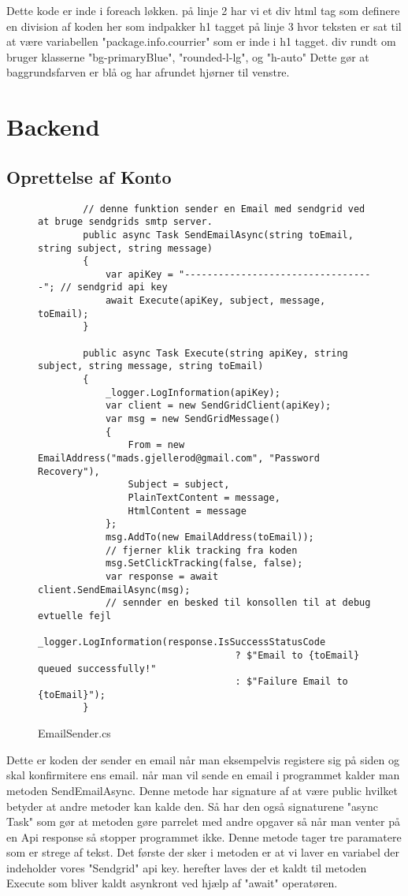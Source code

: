 Dette kode er inde i foreach løkken. på linje 2 har vi et div html tag som definere en division af koden
her  som indpakker h1 tagget på linje 3 hvor teksten er sat til at være variabellen "package.info.courrier" som er 
inde i h1 tagget. div rundt om bruger klasserne "bg-primaryBlue", "rounded-l-lg", og "h-auto" Dette gør at baggrundsfarven er blå
og har afrundet hjørner til venstre.


\section{Backend}
\subsection{Oprettelse af Konto}
\newpage
\begin{figure}[!ht]
    \begin{verbatim}
        // denne funktion sender en Email med sendgrid ved at bruge sendgrids smtp server.
        public async Task SendEmailAsync(string toEmail, string subject, string message)
        {
            var apiKey = "----------------------------------"; // sendgrid api key
            await Execute(apiKey, subject, message, toEmail);
        }
    
        public async Task Execute(string apiKey, string subject, string message, string toEmail)
        {
            _logger.LogInformation(apiKey);
            var client = new SendGridClient(apiKey);
            var msg = new SendGridMessage()
            {
                From = new EmailAddress("mads.gjellerod@gmail.com", "Password Recovery"),
                Subject = subject,
                PlainTextContent = message,
                HtmlContent = message
            };
            msg.AddTo(new EmailAddress(toEmail));
            // fjerner klik tracking fra koden 
            msg.SetClickTracking(false, false);
            var response = await client.SendEmailAsync(msg);
            // sennder en besked til konsollen til at debug evtuelle fejl
            _logger.LogInformation(response.IsSuccessStatusCode
                                   ? $"Email to {toEmail} queued successfully!"
                                   : $"Failure Email to {toEmail}");
        }
    \end{verbatim}
\caption{EmailSender.cs}\label{code:EmailSender.cs}
\end{figure}

Dette er koden der sender en email når man eksempelvis registere sig på siden og skal 
konfirmitere ens email. når man vil sende en email i programmet kalder man metoden SendEmailAsync.
Denne metode har signature af at være public hvilket betyder at andre metoder kan kalde den. Så har
den også signaturene "async Task" som gør at metoden gøre parrelet med andre opgaver så når man venter på
en Api response så stopper programmet ikke. Denne metode tager tre paramatere som er strege af tekst.
Det første der sker i metoden er at vi laver en variabel der indeholder vores "Sendgrid" api key.
herefter laves der et kaldt til metoden Execute som bliver kaldt asynkront ved hjælp af "await" operatøren.

